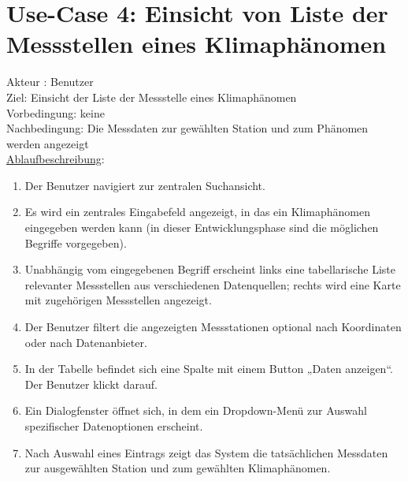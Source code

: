 \documentclass[a4paper,12pt]{scrreprt}
\begin{document}
	\section*{\small \textbf{Use-Case 4: Einsicht von Liste der Messstellen eines Klimaphänomen}}
	Akteur : Benutzer\\
	Ziel: Einsicht der Liste der Messstelle eines Klimaphänomen\\
	Vorbedingung: keine\\
	Nachbedingung: Die Messdaten zur gewählten Station und zum Phänomen werden angezeigt\\
	\underline{Ablaufbeschreibung}:
	\begin{enumerate}
		\item Der Benutzer navigiert zur zentralen Suchansicht.
		\item Es wird ein zentrales Eingabefeld angezeigt, in das ein Klimaphänomen eingegeben werden kann (in dieser Entwicklungsphase sind die möglichen Begriffe vorgegeben).
		\item Unabhängig vom eingegebenen Begriff erscheint links eine tabellarische Liste relevanter Messstellen aus verschiedenen Datenquellen; rechts wird eine Karte mit zugehörigen Messstellen angezeigt.
		\item Der Benutzer filtert die angezeigten Messstationen optional nach Koordinaten oder nach Datenanbieter.
		\item In der Tabelle befindet sich eine Spalte mit einem Button „Daten anzeigen“. Der Benutzer klickt darauf.
		\item Ein Dialogfenster öffnet sich, in dem ein Dropdown-Menü zur Auswahl spezifischer Datenoptionen erscheint.
		\item Nach Auswahl eines Eintrags zeigt das System die tatsächlichen Messdaten zur ausgewählten Station und zum gewählten Klimaphänomen.
	\end{enumerate}
	
\end{document}
